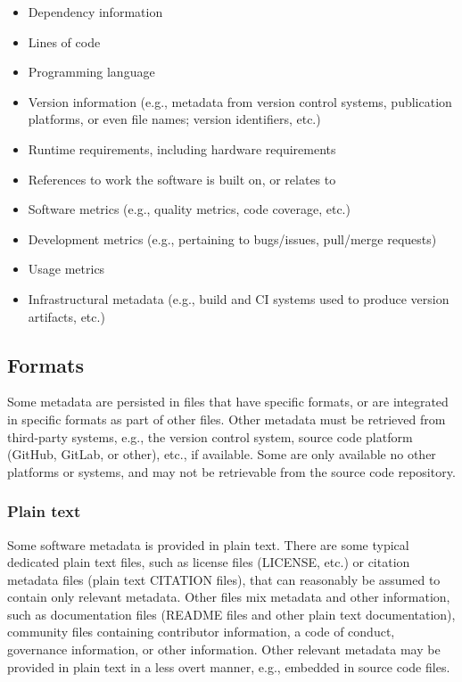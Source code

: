 \documentclass{article}
\begin{document}
\begin{itemize}  
  \item Dependency information
  \item Lines of code
  \item Programming language
  \item Version information (e.g., metadata from version control systems, publication platforms, or even file names; version identifiers, etc.)
  \item Runtime requirements, including hardware requirements
  \item References to work the software is built on, or relates to
  \item Software metrics (e.g., quality metrics, code coverage, etc.)
  \item Development metrics (e.g., pertaining to bugs/issues, pull/merge requests)
  \item Usage metrics
  \item Infrastructural metadata (e.g., build and CI systems used to produce version artifacts, etc.)
\end{itemize}

\subsection{Formats}\label{v9la4dmlynrm}
Some metadata are persisted in files that have specific formats, or are integrated in specific formats as part of other files. Other metadata must be retrieved from third-party systems, e.g., the version control system, source code platform (GitHub, GitLab, or other), etc., if available. Some are only available no other platforms or systems, and may not be retrievable from the source code repository.



\subsubsection{Plain text}\label{uerestsmsnj}
Some software metadata is provided in plain text. There are some typical dedicated plain text files, such as license files (LICENSE, etc.) or citation metadata files (plain text CITATION files), that can reasonably be assumed to contain only relevant metadata. Other files mix metadata and other information, such as documentation files (README files and other plain text documentation), community files containing contributor information, a code of conduct, governance information, or other information. Other relevant metadata may be provided in plain text in a less overt manner, e.g., embedded in source code files. 
\end{document}
